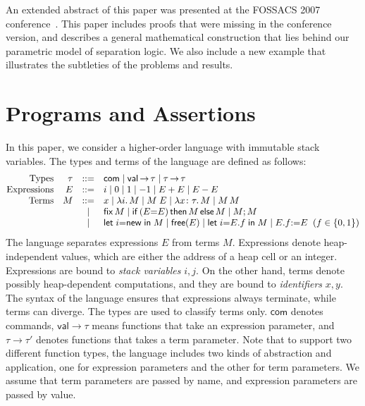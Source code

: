 \documentclass{LMCS}
\newcommand{\val}{\mathsf{val}}
\newcommand{\com}{\mathsf{com}}
\newcommand{\new}{\mathsf{new}}
\newcommand{\free}{\mathsf{free}}
\newcommand{\ifz}{\mathsf{if}}
\newcommand{\fix}{\mathsf{fix}}
\newcommand{\mletin}[2]{\mathsf{let}\;{#1}\;\mathsf{in}\;{#2}}
\newcommand{\then}{\mathsf{then}}
\newcommand{\melse}{\mathsf{else}}
\begin{document}
An extended abstract of this paper was presented at the FOSSACS 2007
conference~\cite{birkedal-yang-fossacs07}. This paper includes proofs that
were missing in the conference version, and describes a general
mathematical construction that lies behind our parametric model of
separation logic. We also include a new example that illustrates the
subtleties of the problems and results.



\section{Programs and Assertions}
\label{sec:programs-and-assertions}
In this paper, we consider a 
higher-order language with immutable stack variables.
The types and terms of the language are defined as follows:
{
$$
\begin{array}{@{}rrcl@{}}
\mbox{Types} &
\tau & ::= & \com
       \mid \val \,{\rightarrow}\, \tau
       \mid \tau \,{\rightarrow}\, \tau 
\\
\mbox{Expressions} &
E & ::= & 
  i \mid 0 \mid 1 \mid -1 \mid E+E \mid E-E
\\
\mbox{Terms} &
M & ::= & x 
    \mid \lambda i.\,M  
    \mid M\; E
    \mid \lambda x\colon \tau.\,M  
    \mid M\, M \\
&& \mid & 
    \fix\,M  
    \mid \ifz\,(E{=}E)\,\then\,M\,\melse\,M 
    \mid M;M \\
&& \mid &
    \mletin{i{=}\new}{M}
    \mid \free(E)
    \mid \mletin{i{=}E.f}{M}
    \mid E.f{:=}E \;\;(f\in\{0,1\})
\end{array}$$}
The language separates expressions $E$ from terms $M$.
Expressions denote heap-independent values, which
are either the address of a heap cell or an integer.
Expressions are bound to 
{\em stack variables} $i,j$. On the other hand,
terms denote possibly heap-dependent computations,
 and  they
are bound to {\em identifiers} $x,y$. The syntax
of the language ensures that expressions always
terminate, while terms can diverge. The types are
used to classify terms only. $\com$ denotes commands, 
$\val \rightarrow \tau$ means functions
that take an expression parameter, and
$\tau \rightarrow \tau'$ denotes functions that
takes a term parameter. Note that to support
two different function types, the language
includes two kinds of abstraction and application,
one for expression parameters and the other for term 
parameters. We assume that term parameters are
passed by name, and expression parameters are
passed by value.
\end{document}
